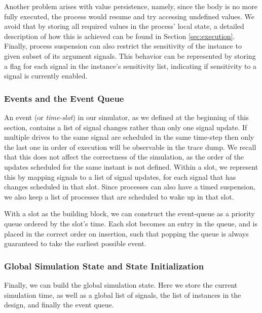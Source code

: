 Another problem arises with value persistence, namely, since the body is no more fully executed, the process would resume and try accessing undefined values. We avoid that by storing all required values in the process' local state, a detailed description of how this is achieved can be found in Section \ref{sec:execution}. Finally, process suspension can also restrict the sensitivity of the instance to given subset of its argument signals. This behavior can be represented by storing a flag for each signal in the instance's sensitivity list, indicating if sensitivity to a signal is currently enabled.



\subsubsection{Events and the Event Queue}
An event (or \textit{time-slot}) in our simulator, as we defined at the beginning of this section, contains a list of signal changes rather than only one signal update. If multiple drives to the same signal are scheduled in the same time-step then only the last one in order of execution will be observable in the trace dump. We recall that this does not affect the correctness of the simulation, as the order of the updates scheduled for the same instant is not defined. Within a slot, we represent this by mapping signals to a list of signal updates, for each signal that has changes scheduled in that slot. Since processes can also have a timed suspension, we also keep a list of processes that are scheduled to wake up in that slot.

With a slot as the building block, we can construct the event-queue as a priority queue ordered by the slot's time. Each slot becomes an entry in the queue, and is placed in the correct order on insertion, such that popping the queue is always guaranteed to take the earliest possible event.


\subsubsection{Global Simulation State and State Initialization}
\label{sec:state}
Finally, we can build the global simulation state. Here we store the current simulation time, as well as a global list of signals, the list of instances in the design, and finally the event queue.

